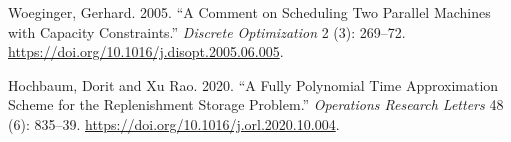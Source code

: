 \documentclass[11pt]{article} %
\theoremstyle{definition}
\begin{document}
%
%
%
%
%
%
%
%
Woeginger, Gerhard. 2005. ``A Comment on Scheduling Two Parallel Machines with Capacity Constraints.'' \emph{Discrete Optimization} 2 (3): 269--72. \url{https://doi.org/10.1016/j.disopt.2005.06.005}. 

%
Hochbaum, Dorit and Xu Rao. 2020. ``A Fully Polynomial Time Approximation Scheme for the Replenishment Storage Problem.'' \emph{Operations Research Letters} 48 (6): 835--39. \url{https://doi.org/10.1016/j.orl.2020.10.004}.
\end{document}
